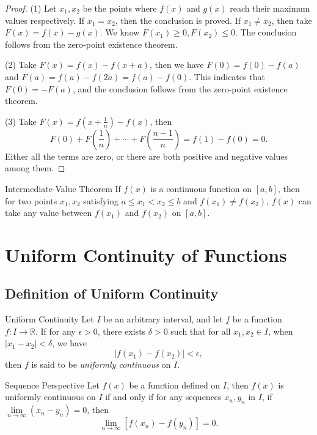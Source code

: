 \begin{proof}
  (1) Let $x_1, x_2$ be the points where $f(x)$ and $g(x)$ reach their maximum
  values respectively. If $x_1 = x_2$, then the conclusion is proved.
  If $x_1 \neq x_2$, then take $F(x) = f(x) - g(x)$. We know $F(x_1) \geq 0,
  F(x_2) \leq 0$. The conclusion follows from the zero-point existence theorem.

  (2) Take $F(x) = f(x) - f(x+a)$, then we have $F(0) = f(0) - f(a)$ and $F(a) =
  f(a) - f(2a) = f(a) - f(0)$.
  This indicates that $F(0) = -F(a)$, and the conclusion follows from the
  zero-point existence theorem.

  (3) Take $F(x) = f(x + \frac{1}{n}) - f(x)$, then
  \begin{equation}
    F(0) + F(\frac{1}{n}) + \cdots + F(\frac{n-1}{n}) = f(1) - f(0) = 0.
  \end{equation}
  Either all the terms are zero, or there are both positive and negative values
  among them.
\end{proof}

\begin{theorem}{Intermediate-Value Theorem}{}
  If $f(x)$ is a continuous function on $[a, b]$,
  then for two points $x_1, x_2$ satisfying $a \leq x_1 < x_2 \leq b$ and
  $f(x_1) \neq f(x_2)$,
  $f(x)$ can take any value between $f(x_1)$ and $f(x_2)$ on $[a, b]$.
\end{theorem}


\section{Uniform Continuity of Functions}

\subsection{Definition of Uniform Continuity}

\begin{definition}{Uniform Continuity}{}
  Let $I$ be an arbitrary interval,
  and let $f$ be a function $f: I \rightarrow \mathbb{R}$.
  If for any $\epsilon > 0$, there exists $\delta > 0$ such that for all $x_1,
  x_2 \in I$, when $|x_1 - x_2| < \delta$, we have
  \begin{equation}
    |f(x_1) - f(x_2)| < \epsilon,
  \end{equation}
  then $f$ is said to be \emph{uniformly continuous} on $I$.
\end{definition}

\begin{proposition}{Sequence Perspective}{}
  Let $f(x)$ be a function defined on $I$,
  then $f(x)$ is uniformly continuous on $I$ if and only if
  for any sequences $x_n, y_n$ in $I$,
  if $\lim \limits _{n \rightarrow \infty} (x_n - y_n) = 0$,
  then
  \begin{equation}
    \lim \limits _{n \rightarrow \infty} \left[ f(x_n) - f(y_n) \right] = 0.
  \end{equation}
\end{proposition}

